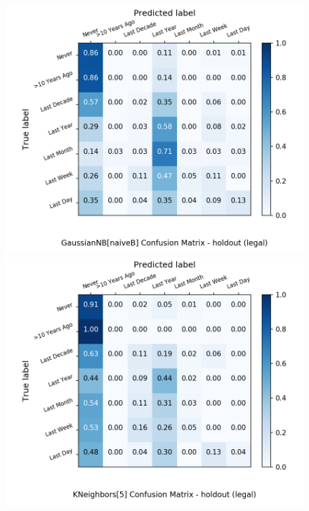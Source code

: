 \begin{figure}[H]
\begin{minipage}[b]{0.32\textwidth}
		\includegraphics[width=1.1\textwidth]{Plots/legal_GaussianNB_naiveB_balance_False_holdout.png}
	\end{minipage}
	\begin{minipage}[b]{0.32\textwidth}
		\includegraphics[width=1.1\textwidth]{Plots/legal_KNeighbors_5_balance_False_holdout.png}
  \end{minipage}
	\begin{minipage}[b]{0.32\textwidth}

\end{minipage}
\end{figure}
